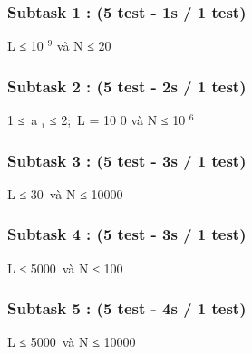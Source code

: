 \subsubsection{   Subtask 1 : (5 test - 1s / 1 test)  }

   L ≤ 10   $^    9   $   và N ≤ 20  

\subsubsection{   Subtask 2 : (5 test - 2s / 1 test)  }

   1 ≤ a   $_    i   $   ≤ 2; L = 10       0      và N ≤ 10   $^    6   $

\subsubsection{   Subtask 3 : (5 test - 3s / 1 test)  }

   L ≤ 30 và N ≤ 10000  

\subsubsection{   Subtask 4 : (5 test - 3s / 1 test)  }

   L ≤ 5000 và N ≤ 100  

\subsubsection{   Subtask 5 : (5 test - 4s / 1 test)  }

   L ≤ 5000 và N ≤ 10000  